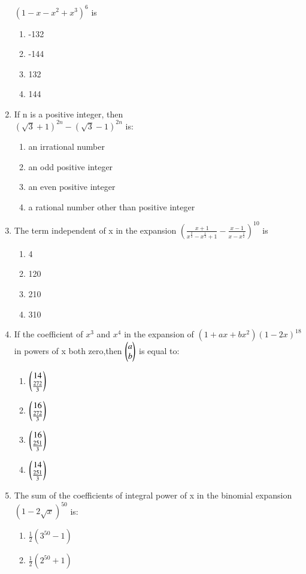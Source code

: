 \begin{enumerate}[label=\arabic*.,ref=\thesubsection.\theenumi]
 $(1-x-x^2+x^3)^6$ is
\begin{enumerate}
    \item -132
    \item -144
    \item 132
    \item 144
\end{enumerate}
\item If n is a positive integer, then\\
$(\sqrt{3}+1)^{2n}-(\sqrt{3}-1)^{2n}$ is:
\begin{enumerate}
    \item an irrational number 
    \item an odd positive integer
    \item an even positive integer
    \item a rational number other than positive integer
\end{enumerate}
\item The term independent of x in the expansion $(\frac{x+1}{x^\frac{2}{3}-x^\frac{1}{3}+1}-\frac{x-1}{x-x^\frac{1}{2}})^{10}$ is
\begin{enumerate}
    \item 4
    \item 120
    \item 210
    \item 310
\end{enumerate}
\item If the coefficient of $x^3$ and $x^4$ in the expansion of $(1+ax+bx^2)(1-2x)^{18}$ in powers of x both zero,then $\begin{pmatrix}a\\b\end{pmatrix}$ is equal to:
\begin{enumerate}
    \item $\begin{pmatrix}14\\\frac{272}{3}\end{pmatrix}$
    \item $\begin{pmatrix}16\\\frac{272}{3}\end{pmatrix}$
    \item $\begin{pmatrix}16\\\frac{251}{3}\end{pmatrix}$
    \item $\begin{pmatrix}14\\\frac{251}{3}\end{pmatrix}$
\end{enumerate}
\item The sum of the coefficients of integral power of x in the binomial expansion \\
$(1-2\sqrt{x})^{50}$ is:
\begin{enumerate}
    \item $\frac{1}{2} (3^{50}-1)$
    \item $\frac{1}{2} (2^{50}+1)$

\end{enumerate}
\end{enumerate}
